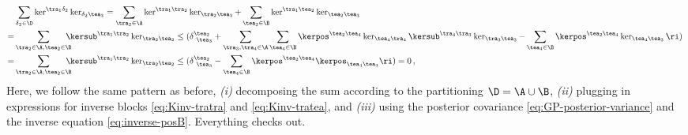 \begin{align}
&\sum_{\delta_2\in\D}\ker^{\tra_1\delta_2}\ker_{\delta_2 \tea_3}=\sum_{\tra_2\in\A}\ker^{\tra_1\tra_2}\ker_{\tra_2 \tea_3}+\sum_{\tea_2\in\B}\ker^{\tra_1\tea_2}\ker_{\tea_2 \tea_3}\, \\
=&\sum_{\tra_2\in\A,\tea_2\in\B}\!\!\!\!\!\kersub^{\tra_1\tra_2}\ker_{\tra_2\tea_2}\le(\delta^{\tea_2}_{\ \tea_3}+\sum_{\tra_3,\tra_4\in\A}\sum_{\tea_4\in\B}\kerpos^{\tea_2\tea_4}\ker_{\tea_4\tra_4}\kersub^{\tra_4\tra_3}\ker_{\tra_3\tea_3}-\sum_{\tea_4\in\B}\kerpos^{\tea_2\tea_4}\ker_{\tea_4\tea_3}\ri)\, \notag\\
=&\sum_{\tra_2\in\A,\tea_2\in\B}\!\!\!\!\!\kersub^{\tra_1\tra_2}\ker_{\tra_2\tea_2}\le(\delta^{\tea_2}_{\ \tea_3}-\sum_{\tea_4\in\B}\kerpos^{\tea_2\tea_4}\kerpos_{\tea_4\tea_3}\ri)=0\, ,\notag
\end{align}
Here,  we follow the same pattern as before, \emph{(i)} decomposing the sum according to the partitioning $\D = \A \cup \B$, \emph{(ii)} plugging in expressions for inverse blocks \eqref{eq:Kinv-tratra} and \eqref{eq:Kinv-tratea}, and \emph{(iii)} using the posterior covariance \eqref{eq:GP-posterior-variance} and the inverse equation \eqref{eq:inverse-posB}. Everything checks out.










